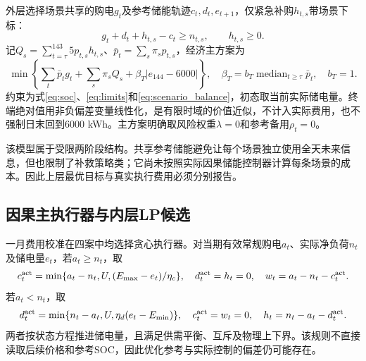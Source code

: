 外层选择场景共享的购电$g_t$及参考储能轨迹$c_t,d_t,e_{t+1}$，仅紧急补购$h_{t,s}$带场景下标：
\begin{equation}
 g_t+d_t+h_{t,s}-c_t\ge n_{t,s},\qquad h_{t,s}\ge0.
 \label{eq:scenario_balance}
\end{equation}
记$Q_s=\sum_{t=\tau}^{143}5p_{t,s}h_{t,s}$、$\bar p_t=\sum_s\pi_sp_{t,s}$，经济主方案为
\begin{equation}
 \min\left\{\sum_t\bar p_tg_t+\sum_s\pi_sQ_s+\beta_T|e_{144}-6000|\right\},
 \quad\beta_T=b_T\operatorname{median}_{t\ge\tau}\bar p_t,\quad b_T=1.
 \label{eq:q2_objective}
\end{equation}
约束为式\eqref{eq:soc}、\eqref{eq:limits}和\eqref{eq:scenario_balance}，初态取当前实际储电量。终端绝对值用非负偏差变量线性化，是有限时域的价值近似，不计入实际费用，也不强制日末回到6000 kWh。主方案明确取风险权重$\lambda=0$和参考备用$\rho_t=0$。

该模型属于受限两阶段结构。共享参考储能避免让每个场景独立使用全天未来信息，但也限制了补救策略类；它尚未按照实际因果储能控制器计算每条场景的成本。因此上层最优目标与真实执行费用必须分别报告。

\subsection{因果主执行器与内层LP候选}

一月费用校准在四案中均选择贪心执行器。对当期有效常规购电$a_t$、实际净负荷$n_t$及储电量$e_t$，若$a_t\ge n_t$，取
\begin{equation}
 c_t^{\rm act}=\min\{a_t-n_t,U,(E_{\max}-e_t)/\eta_c\},\quad
 d_t^{\rm act}=h_t=0,\quad w_t=a_t-n_t-c_t^{\rm act}.
 \label{eq:execute_charge}
\end{equation}
若$a_t<n_t$，取
\begin{equation}
 d_t^{\rm act}=\min\{n_t-a_t,U,\eta_d(e_t-E_{\min})\},\quad
 c_t^{\rm act}=w_t=0,\quad h_t=n_t-a_t-d_t^{\rm act}.
 \label{eq:execute_discharge}
\end{equation}
两者按状态方程推进储电量，且满足供需平衡、互斥及物理上下界。该规则不直接读取后续价格和参考SOC，因此优化参考与实际控制的偏差仍可能存在。

